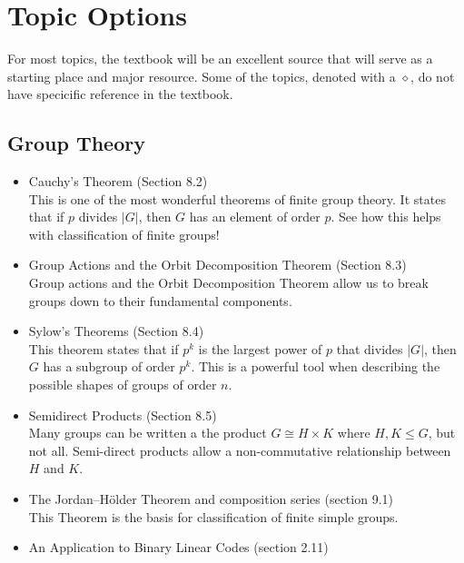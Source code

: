 \documentclass[12pt]{article}
\begin{document}
\newpage

	\section*{Topic Options}
	For most topics, the textbook will be an excellent source that will serve as a starting place and major resource.  Some of the topics, denoted with a $\diamond$, do not have specicific reference in the textbook. 
	
	\begin{center}
	\end{center}
	\subsection*{Group Theory}
	\begin{itemize}
		\item Cauchy's Theorem (Section 8.2)\\
			
			This is one of the most wonderful theorems of finite group theory.  It states that if $p$ divides $|G|$, then $G$ has an element of order $p$. See how this helps with classification of finite groups!
		\item Group Actions and the Orbit Decomposition Theorem (Section 8.3)\\
		
			Group actions and the Orbit Decomposition Theorem allow us to break groups down to their fundamental components.
		\item Sylow's Theorems (Section 8.4)\\
		
			This theorem states that if $p^k$ is the largest power of $p$ that divides $|G|$, then $G$ has a subgroup of order $p^k$.  This is a powerful tool when describing the possible shapes of groups of order $n$.
		\item Semidirect Products (Section 8.5)\\
		
			Many groups can be written a the product $G\cong H\times K$ where $H,K\leq G$, but not all.  Semi-direct products allow a non-commutative relationship between $H$ and $K$.
		\item The Jordan--H\"older Theorem and composition series (section 9.1)\\
		
			This Theorem is the basis for classification of finite simple groups.
%		
%			
		\item An Application to Binary Linear Codes (section 2.11)
			

\end{itemize}
\end{document}
